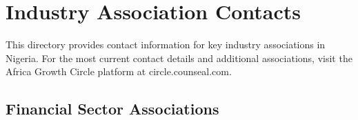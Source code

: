 
\chapter{Industry Association Contacts}\label{ch:industry-associations}

\begin{importantbox}
This directory provides contact information for key industry associations in Nigeria. For the most current contact details and additional associations, visit the Africa Growth Circle platform at circle.counseal.com.
\end{importantbox}

\vspace{2em}

\section{Financial Sector Associations}\label{sec:financial-associations}
\vspace{1em}

